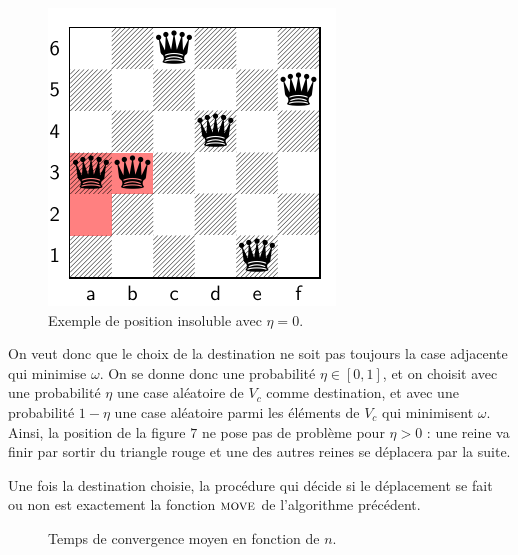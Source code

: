 \documentclass[11pt, openany]{article}
\newcommand{\M}{\textsc{move}}
\begin{document}

\begin{figure}[htb]
\centering

\includegraphics[scale=0.85]{fig7_scissored.pdf}

\caption{Exemple de position insoluble avec $\eta=0$.}
\end{figure}

\medskip

On veut donc que le choix de la destination ne soit pas toujours la case adjacente qui minimise $\omega$. On se donne donc une probabilité $\eta \in [0,1]$, et on choisit avec une probabilité $\eta$ une case aléatoire de $V_c$ comme destination, et avec une probabilité $1 - \eta$ une case aléatoire parmi les éléments de $V_c$ qui minimisent $\omega$. Ainsi, la position de la figure $7$ ne pose pas de problème pour $\eta > 0$ : une reine va finir par sortir du triangle rouge et une des autres reines se déplacera par la suite.

Une fois la destination choisie, la procédure qui décide si le déplacement se fait ou non est exactement la fonction $\M$ de l'algorithme précédent.

\bigskip

\begin{figure}
  \centering
  \caption{Temps de convergence moyen en fonction de $n$.}
\end{figure}  
\end{document}
